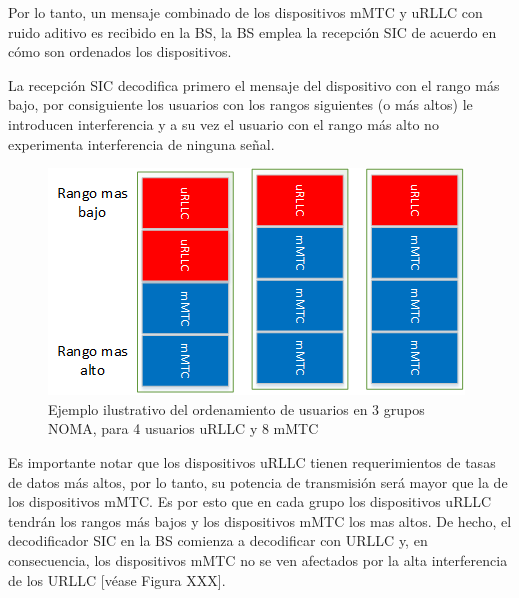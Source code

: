 Por lo tanto, un mensaje combinado de los dispositivos mMTC y uRLLC con ruido aditivo es recibido en la BS, la BS emplea la recepción SIC de acuerdo en cómo son ordenados los dispositivos. \newline

La recepción SIC decodifica primero el mensaje del dispositivo con el rango más bajo, por consiguiente los usuarios con los rangos siguientes (o más altos) le introducen interferencia y a su vez el usuario con el rango más alto no experimenta interferencia de ninguna señal.\newline

\begin{figure}[th]
    \centering
    \includegraphics[scale=1]{Figures/EjemploNOMAclusters}
    \decoRule
    \caption[Ejemplo ilustrativo del ordenamiento de usuarios en los grupos NOMA]{Ejemplo ilustrativo del ordenamiento de usuarios en 3 grupos NOMA, para 4 usuarios uRLLC y 8 mMTC}
    \label{fig:NOMAgrupoexample}
\end{figure}

Es importante notar que los dispositivos uRLLC tienen requerimientos de tasas de datos más altos, por lo tanto, su potencia de transmisión será mayor que la de los dispositivos mMTC. Es por esto que en cada grupo los dispositivos uRLLC tendrán los rangos más bajos y los dispositivos mMTC los mas altos. De hecho, el decodificador SIC en la BS comienza a decodificar con URLLC y, en consecuencia, los dispositivos mMTC no se ven afectados por la alta interferencia de los URLLC [véase Figura XXX].\newline


